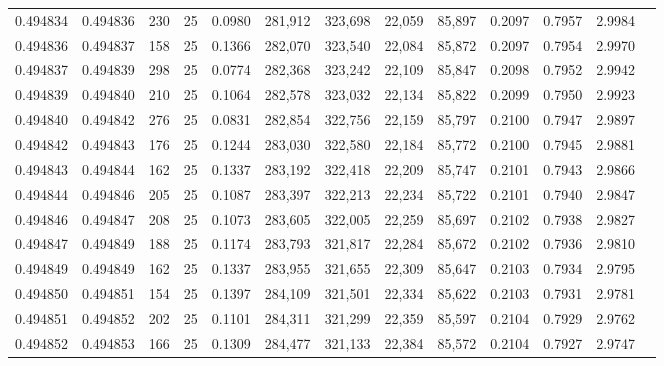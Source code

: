 \begin{tabular}{rrrrrrrrrrrrr}
0.494834 & 0.494836 &   230 &  25 &                                     0.0980 & 281,912 & 323,698 &  22,059 &  85,897 & 0.2097 & 0.7957 & 2.9984 \\
0.494836 & 0.494837 &   158 &  25 &                                     0.1366 & 282,070 & 323,540 &  22,084 &  85,872 & 0.2097 & 0.7954 & 2.9970 \\
0.494837 & 0.494839 &   298 &  25 &                                     0.0774 & 282,368 & 323,242 &  22,109 &  85,847 & 0.2098 & 0.7952 & 2.9942 \\
0.494839 & 0.494840 &   210 &  25 &                                     0.1064 & 282,578 & 323,032 &  22,134 &  85,822 & 0.2099 & 0.7950 & 2.9923 \\
0.494840 & 0.494842 &   276 &  25 &                                     0.0831 & 282,854 & 322,756 &  22,159 &  85,797 & 0.2100 & 0.7947 & 2.9897 \\
0.494842 & 0.494843 &   176 &  25 &                                     0.1244 & 283,030 & 322,580 &  22,184 &  85,772 & 0.2100 & 0.7945 & 2.9881 \\
0.494843 & 0.494844 &   162 &  25 &                                     0.1337 & 283,192 & 322,418 &  22,209 &  85,747 & 0.2101 & 0.7943 & 2.9866 \\
0.494844 & 0.494846 &   205 &  25 &                                     0.1087 & 283,397 & 322,213 &  22,234 &  85,722 & 0.2101 & 0.7940 & 2.9847 \\
0.494846 & 0.494847 &   208 &  25 &                                     0.1073 & 283,605 & 322,005 &  22,259 &  85,697 & 0.2102 & 0.7938 & 2.9827 \\
0.494847 & 0.494849 &   188 &  25 &                                     0.1174 & 283,793 & 321,817 &  22,284 &  85,672 & 0.2102 & 0.7936 & 2.9810 \\
0.494849 & 0.494849 &   162 &  25 &                                     0.1337 & 283,955 & 321,655 &  22,309 &  85,647 & 0.2103 & 0.7934 & 2.9795 \\
0.494850 & 0.494851 &   154 &  25 &                                     0.1397 & 284,109 & 321,501 &  22,334 &  85,622 & 0.2103 & 0.7931 & 2.9781 \\
0.494851 & 0.494852 &   202 &  25 &                                     0.1101 & 284,311 & 321,299 &  22,359 &  85,597 & 0.2104 & 0.7929 & 2.9762 \\
0.494852 & 0.494853 &   166 &  25 &                                     0.1309 & 284,477 & 321,133 &  22,384 &  85,572 & 0.2104 & 0.7927 & 2.9747 \\

\end{tabular}
